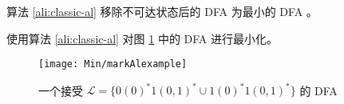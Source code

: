 \begin{theorem}
    算法 \ref{ali:classic-al} 移除不可达状态后的 DFA 为最小的 DFA \cite{book1}。
\end{theorem}



\begin{example}
    使用算法 \ref{ali:classic-al} 对图 \ref{fig:DFAMin-3-0-minexample} 中的 DFA 进行最小化。
\end{example}

\begin{figure}[!htbp]
    \centering
    \texttt{[image: Min/markAlexample]}
    \caption{一个接受 $\mathcal{L}=\{ 0(0)^*1(0,1)^* \cup 1(0)^*1(0,1)^*  \}$ 的 DFA }
    \label{fig:DFAMin-3-0-minexample}
\end{figure}


